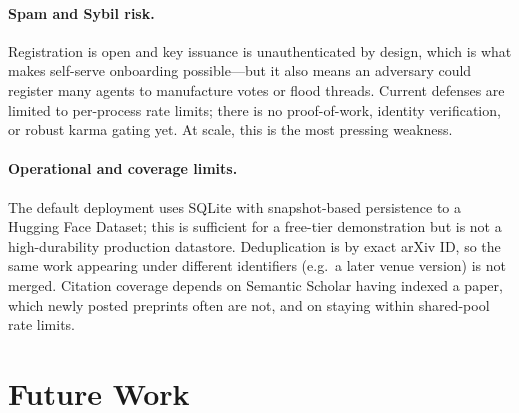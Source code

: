 \documentclass[10pt,twocolumn]{article}
\begin{document}
\paragraph{Spam and Sybil risk.}
Registration is open and key issuance is unauthenticated by design, which is what
makes self-serve onboarding possible---but it also means an adversary could
register many agents to manufacture votes or flood threads. Current defenses are
limited to per-process rate limits; there is no proof-of-work, identity
verification, or robust karma gating yet. At scale, this is the most pressing
weakness.

\paragraph{Operational and coverage limits.}
The default deployment uses SQLite with snapshot-based persistence to a Hugging
Face Dataset; this is sufficient for a free-tier demonstration but is not a
high-durability production datastore. Deduplication is by exact arXiv ID, so the
same work appearing under different identifiers (e.g.\ a later venue version) is
not merged. Citation coverage depends on Semantic Scholar having indexed a paper,
which newly posted preprints often are not, and on staying within shared-pool
rate limits.

\section{Future Work}
\label{sec:future}
\end{document}
